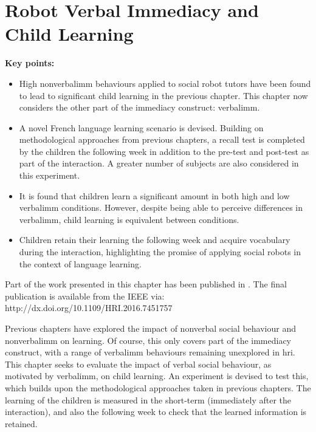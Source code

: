 \chapter{Robot Verbal Immediacy and Child Learning} \label{chap:verbal}

\begin{framed}
	\textbf{Key points:}
	
	\begin{itemize}
	\item High \gls{nonverbalimm} behaviours applied to social robot tutors have been found to lead to significant child \gls{learning} in the previous chapter. This chapter now considers the other part of the immediacy construct: \gls{verbalimm}.
	\item A novel French language learning scenario is devised. Building on methodological approaches from previous chapters, a recall test is completed by the children the following week in addition to the pre-test and post-test as part of the interaction. A greater number of subjects are also considered in this experiment.
	\item It is found that children learn a significant amount in both high and low \gls{verbalimm} conditions. However, despite being able to perceive differences in \gls{verbalimm}, child \gls{learning} is equivalent between conditions.
	\item Children retain their \gls{learning} the following week and acquire vocabulary during the interaction, highlighting the promise of applying social robots in the context of language learning.
	\end{itemize}
\end{framed}

Part of the work presented in this chapter has been published in \cite{kennedy2016social}. The final publication is available from the IEEE via: \newline http://dx.doi.org/10.1109/HRI.2016.7451757

\newpage
Previous chapters have explored the impact of nonverbal social behaviour and \gls{nonverbalimm} on \gls{learning}. Of course, this only covers part of the immediacy construct, with a range of \gls{verbalimm} behaviours remaining unexplored in \acrshort{hri}. This chapter seeks to evaluate the impact of verbal social behaviour, as motivated by \gls{verbalimm}, on child \gls{learning}. An experiment is devised to test this, which builds upon the methodological approaches taken in previous chapters. The \gls{learning} of the children is measured in the short-term (immediately after the interaction), and also the following week to check that the learned information is retained.

